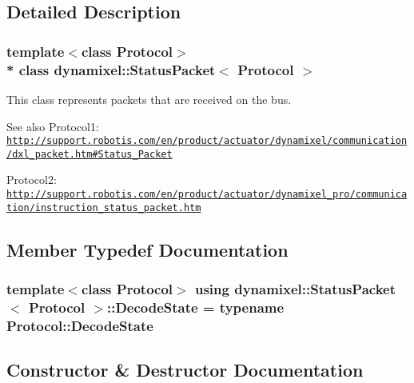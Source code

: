 \subsection{Detailed Description}
\subsubsection*{template$<$class Protocol$>$\\*
class dynamixel\+::\+Status\+Packet$<$ Protocol $>$}

This class represents packets that are received on the bus.

\begin{DoxySeeAlso}{See also}
Protocol1\+: \href{http://support.robotis.com/en/product/actuator/dynamixel/communication/dxl_packet.htm#Status_Packet}{\tt http\+://support.\+robotis.\+com/en/product/actuator/dynamixel/communication/dxl\+\_\+packet.\+htm\#\+Status\+\_\+\+Packet}

Protocol2\+: \href{http://support.robotis.com/en/product/actuator/dynamixel_pro/communication/instruction_status_packet.htm}{\tt http\+://support.\+robotis.\+com/en/product/actuator/dynamixel\+\_\+pro/communication/instruction\+\_\+status\+\_\+packet.\+htm} 
\end{DoxySeeAlso}


\subsection{Member Typedef Documentation}
\subsubsection[{\texorpdfstring{Decode\+State}{DecodeState}}]{\setlength{\rightskip}{0pt plus 5cm}template$<$class Protocol$>$ using {\bf dynamixel\+::\+Status\+Packet}$<$ Protocol $>$\+::{\bf Decode\+State} =  typename Protocol\+::\+Decode\+State}\hypertarget{classdynamixel_1_1_status_packet_a8503d43f735f141c2faa37aaac8abbc6}{}\label{classdynamixel_1_1_status_packet_a8503d43f735f141c2faa37aaac8abbc6}


\subsection{Constructor \& Destructor Documentation}
